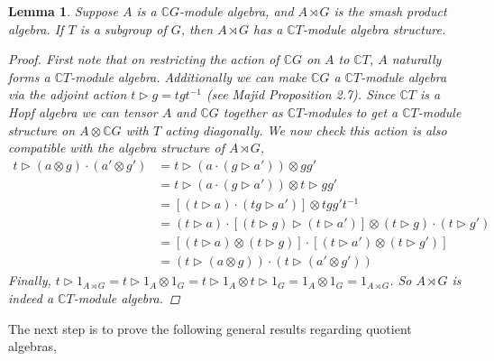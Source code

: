 \documentclass[10pt]{article}
\newcommand{\nt}{\noindent}
\newcommand{\Cc }{\mathbb{C}}
\newcommand{\cd}{\cdot}
\newtheorem{lemma}{Lemma}[section]
\theoremstyle{definition}
\begin{document}
\begin{lemma}\label{building_h_mod_algebras} Suppose $A$ is a $\Cc  G$-module algebra, and $A\rtimes G$ is the smash product algebra.  If $T$ is a subgroup of $G$, then $A\rtimes G$ has a $\Cc  T$-module algebra structure. 
\begin{proof}
First note that on restricting the action of $\Cc  G$ on $A$ to $\Cc T$, $A$ naturally forms a $\Cc  T$-module algebra. Additionally we can make $\Cc  G$ a $\Cc  T$-module algebra via the adjoint action $t\rhd g=tgt^{-1}$ (see Majid \cite{alma9916633704401631} Proposition 2.7). Since $\Cc  T$ is a Hopf algebra we can tensor $A$ and $\Cc  G$ together as $\Cc  T$-modules to get a $\Cc  T$-module structure on $A\otimes \Cc  G$ with $T$ acting diagonally. We now check this action is also compatible with the algebra structure of $A\rtimes G$,%
\begin{align*}
t\rhd (a\otimes g)\cd (a'\otimes g') & = t\rhd (a\cd (g\rhd a'))\otimes gg'\\
& = t\rhd (a\cd (g\rhd a')) \otimes t\rhd gg'\\
& = [(t\rhd a)\cd (tg\rhd a')]\otimes tgg't^{-1}\\
& = (t\rhd a)\cd [(t\rhd g)\rhd (t\rhd a')]\otimes (t\rhd g)\cd (t\rhd g')\\
& = [(t\rhd a)\otimes (t\rhd g)]\cd [(t\rhd a')\otimes (t\rhd g')]\\
& = (t\rhd (a\otimes g))\cd (t\rhd (a'\otimes g'))
\end{align*}
Finally, $t\rhd 1_{A\rtimes G}=t\rhd 1_A\otimes 1_G=t\rhd 1_A\otimes t\rhd 1_G=1_A\otimes 1_G=1_{A\rtimes G}$. So $A\rtimes G$ is indeed a $\Cc T$-module algebra.
\end{proof}
\end{lemma}
\nt The next step is to prove the following general results regarding quotient algebras,
\end{document}
